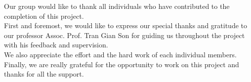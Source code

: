 \noindent Our group would like to thank all individuals who have contributed to the completion of this project. \\

First and foremost, we would like to express our special thanks and gratitude to our professor Assoc. Prof. Tran Gian Son for guiding us throughout the project with his feedback and supervision. \\

We also appreciate the effort and the hard work of each individual members. \\

Finally, we are really grateful for the opportunity to work on this project and thanks for all the support. 







